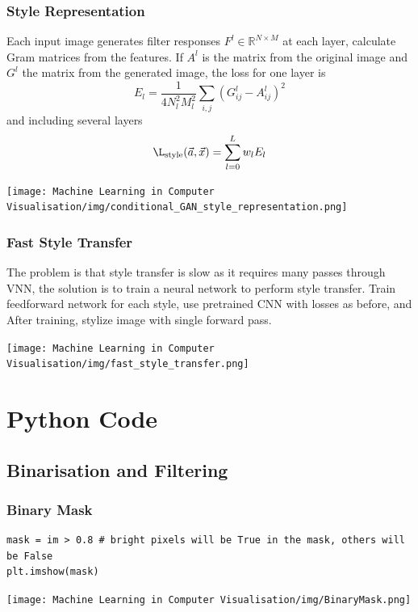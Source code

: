\documentclass[x11names,11pt,a4paper]{article}
\theoremstyle{definition}
\newcommand*\R{\mathbb{R}}
\begin{document}
\subsubsection{Style Representation}
Each input image generates filter responses $F^l \in \R^{N\times M}$ at each layer, calculate Gram matrices from the features. If $A^l$ is the matrix from the original  image and $G^l$ the matrix from the generated image, the loss for one layer is
\begin{equation*}
	E_l = \frac{1}{4 N_l^2 M_l^2}\sum_{i,j}(G_{ij}^l - A_{ij}^l)^2
\end{equation*}
and including several layers
\begin{equation*}
	\L_{\text{style}}(\vec{a},\vec{x}) = \sum_{l=0}^{L}w_l E_l
\end{equation*}

\begin{center}
	\texttt{[image: Machine Learning in Computer Visualisation/img/conditional\_GAN\_style\_representation.png]}
\end{center}

\subsubsection{Fast Style Transfer}
The problem is that style transfer is slow as it requires many passes through VNN, the solution is to train a neural network to perform style transfer. Train feedforward network for each style, use pretrained CNN with losses as before, and After training, stylize image with single forward pass.
\begin{center}
	\texttt{[image: Machine Learning in Computer Visualisation/img/fast\_style\_transfer.png]}
\end{center}

\clearpage
\appendix

\section{Python Code}
\subsection{Binarisation and Filtering}
\subsubsection{Binary Mask}
\begin{verbatim}
mask = im > 0.8 # bright pixels will be True in the mask, others will be False 
plt.imshow(mask)
\end{verbatim}
\begin{center}
	\texttt{[image: Machine Learning in Computer Visualisation/img/BinaryMask.png]}
\end{center}
\end{document}
